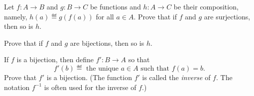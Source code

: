 
\begin{pcomments}
\end{pcomments}



\begin{problem}
  Let $f:A \to B$ and $g: B \to C$ be functions and $h:A \to C$ be their
  composition, namely, $h(a) \eqdef g(f(a))$ for all $a \in A$.
\bparts
  \ppart Prove that if $f$ and $g$ are surjections, then so is $h$.

  \ppart Prove that if $f$ and $g$ are bijections, then so is $h$.

  \ppart If $f$ is a bijection, then define $f':B \to A$ so that
  \[
  f'(b) \eqdef\text{ the unique } a \in A \text{ such that } f(a)=b.
  \]
  Prove that $f'$ is a bijection.  (The function $f'$ is called the
  \emph{inverse} of $f$.  The notation $f^{-1}$ is often used for the
  inverse of $f$.)
\eparts


\end{problem}


\endinput
